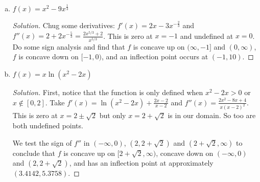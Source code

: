 \begin{enumerate}[(a)]
\begin{proof}[Solution]
          Therefore, $f$ is concave up on $[2k\pi,2k\pi+\pi)$, concave down on $(2k\pi-\pi,2k\pi]$ and
          has an inflection point at $(2k\pi, 0)$ for any integer $k$.
        \end{proof}
  \item $f(x) = x^2-9x^{\frac{1}{3}}$
        \begin{proof}[Solution]
          Chug some derivatives: $f'(x) = 2x - 3x^{-\frac23}$
          and $f''(x) = 2 + 2x^{-\frac53} = \frac{2x^{5/3}+2}{x^{5/3}}$.
          This is zero at $x=-1$ and undefined at $x=0$.
          Do some sign analysis and find that $f$ is concave up on $(\infty,-1]$ and $(0,\infty)$,
          $f$ is concave down on $[-1,0)$, and an inflection point occurs at $(-1,10)$.
        \end{proof}
  \item $f(x) = x\ln(x^2-2x)$
        \begin{proof}[Solution]
          First, notice that the function is only defined when $x^2-2x > 0$ or $x \not\in [0,2]$.
          Take $f'(x) = \ln(x^2-2x) + \frac{2x-2}{x-2}$ and $f''(x) = \frac{2x^2-8x+4}{x(x-2)^2}$.
          This is zero at $x=2\pm\sqrt2$ but only $x=2+\sqrt2$ is in our domain.
          So too are both undefined points.

          We test the sign of $f''$ in $(-\infty,0)$, $(2,2+\sqrt2)$ and $(2+\sqrt2,\infty)$
          to conclude that $f$ is concave up on $[2+\sqrt2,\infty)$,
          concave down on $(-\infty,0)$ and $(2,2+\sqrt2)$,
          and has an inflection point at approximately $(3.4142, 5.3758)$.
        \end{proof}
\end{enumerate}


